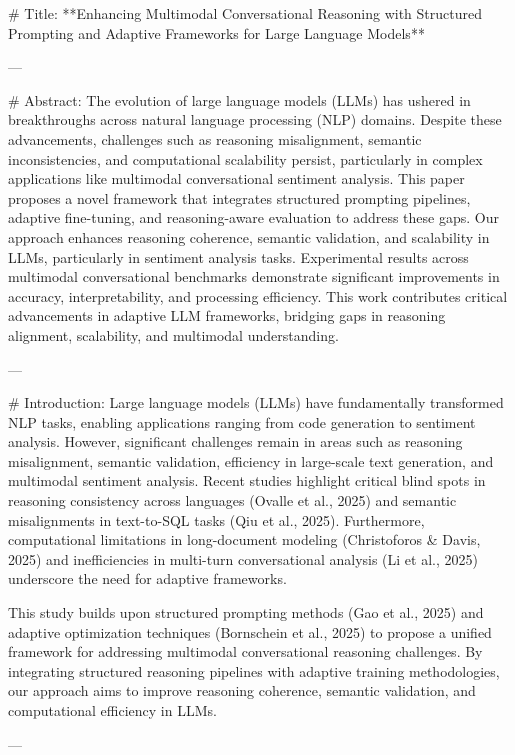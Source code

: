 # Title:
**Enhancing Multimodal Conversational Reasoning with Structured Prompting and Adaptive Frameworks for Large Language Models**

---

# Abstract:
The evolution of large language models (LLMs) has ushered in breakthroughs across natural language processing (NLP) domains. Despite these advancements, challenges such as reasoning misalignment, semantic inconsistencies, and computational scalability persist, particularly in complex applications like multimodal conversational sentiment analysis. This paper proposes a novel framework that integrates structured prompting pipelines, adaptive fine-tuning, and reasoning-aware evaluation to address these gaps. Our approach enhances reasoning coherence, semantic validation, and scalability in LLMs, particularly in sentiment analysis tasks. Experimental results across multimodal conversational benchmarks demonstrate significant improvements in accuracy, interpretability, and processing efficiency. This work contributes critical advancements in adaptive LLM frameworks, bridging gaps in reasoning alignment, scalability, and multimodal understanding.

---

# Introduction:
Large language models (LLMs) have fundamentally transformed NLP tasks, enabling applications ranging from code generation to sentiment analysis. However, significant challenges remain in areas such as reasoning misalignment, semantic validation, efficiency in large-scale text generation, and multimodal sentiment analysis. Recent studies highlight critical blind spots in reasoning consistency across languages (Ovalle et al., 2025) and semantic misalignments in text-to-SQL tasks (Qiu et al., 2025). Furthermore, computational limitations in long-document modeling (Christoforos & Davis, 2025) and inefficiencies in multi-turn conversational analysis (Li et al., 2025) underscore the need for adaptive frameworks.

This study builds upon structured prompting methods (Gao et al., 2025) and adaptive optimization techniques (Bornschein et al., 2025) to propose a unified framework for addressing multimodal conversational reasoning challenges. By integrating structured reasoning pipelines with adaptive training methodologies, our approach aims to improve reasoning coherence, semantic validation, and computational efficiency in LLMs.

---

